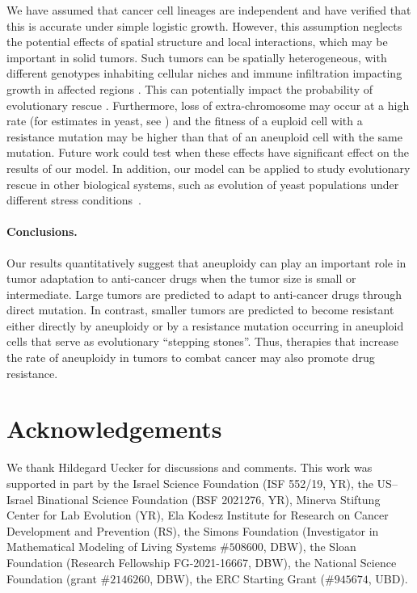 \documentclass[12pt]{extarticle}
\begin{document}
We have assumed that cancer cell lineages are independent and have verified that this is accurate under simple logistic growth. However, this assumption neglects the potential effects of spatial structure and local interactions, which may be important in solid tumors. Such tumors can be spatially heterogeneous, with different genotypes inhabiting cellular niches and immune infiltration impacting growth in affected regions \citep{varrone2023cellcharter,galon2010immune}. This can potentially impact the probability of evolutionary rescue \citep{martens2011spatial}. 
Furthermore, loss of extra-chromosome may occur at a high rate (for estimates in yeast, see \citet{hose_rate_2024}) and the fitness of a euploid cell with a resistance mutation may be higher than that of an aneuploid cell with the same mutation. Future work could test when these effects have significant effect on the results of our model. %
In addition, our model can be applied to study evolutionary rescue in other biological systems, such as evolution of yeast populations under different stress conditions~\citep{pompei2023fitness,kohanovski2024aneuploidy}. 

\paragraph{Conclusions.}

Our results quantitatively suggest that aneuploidy can play an important role in tumor adaptation to anti-cancer drugs when the tumor size is small or intermediate. Large tumors are predicted to adapt to anti-cancer drugs through direct mutation. In contrast, smaller tumors are predicted to become resistant either directly by aneuploidy or by a resistance mutation occurring in aneuploid cells that serve as evolutionary ``stepping stones''. Thus, therapies that increase the rate of aneuploidy in tumors to combat cancer may also promote drug resistance.

{\small
\section*{Acknowledgements}
We thank Hildegard Uecker for discussions and comments. 
This work was supported in part by
the Israel Science Foundation (ISF 552/19, YR),
the US–Israel Binational Science Foundation (BSF 2021276, YR), 
Minerva Stiftung Center for Lab Evolution (YR), 
Ela Kodesz Institute for Research on Cancer Development and Prevention (RS),
the Simons Foundation (Investigator in Mathematical Modeling of Living Systems $\#508600$, DBW),
the Sloan Foundation (Research Fellowship FG-2021-16667, DBW),
the National Science Foundation (grant $\#2146260$, DBW), the ERC Starting Grant ($\#945674$, UBD).
}
\end{document}
